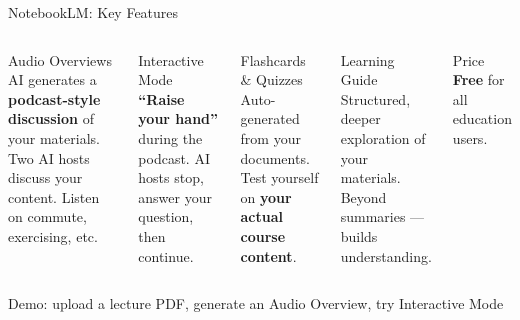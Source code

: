 \documentclass[aspectratio=169]{beamer}
\begin{document}
\begin{frame}{NotebookLM: Key Features}
\small
\begin{columns}[T]
\begin{block}{Audio Overviews}
AI generates a \textbf{podcast-style discussion} of your materials. Two AI hosts discuss your content. Listen on commute, exercising, etc.
\end{block}

\smallskip
\begin{block}{Interactive Mode}
\textbf{``Raise your hand''} during the podcast. AI hosts stop, answer your question, then continue.
\end{block}

\begin{block}{Flashcards \& Quizzes}
Auto-generated from your documents. Test yourself on \textbf{your actual course content}.
\end{block}

\smallskip
\begin{block}{Learning Guide}
Structured, deeper exploration of your materials. Beyond summaries --- builds understanding.
\end{block}

\smallskip
\begin{exampleblock}{Price}
\textbf{Free} for all education users.
\end{exampleblock}
\end{columns}

\smallskip
\begin{center}
\footnotesize\color{orange1}
Demo: upload a lecture PDF, generate an Audio Overview, try Interactive Mode
\end{center}
\end{frame}
\end{document}

